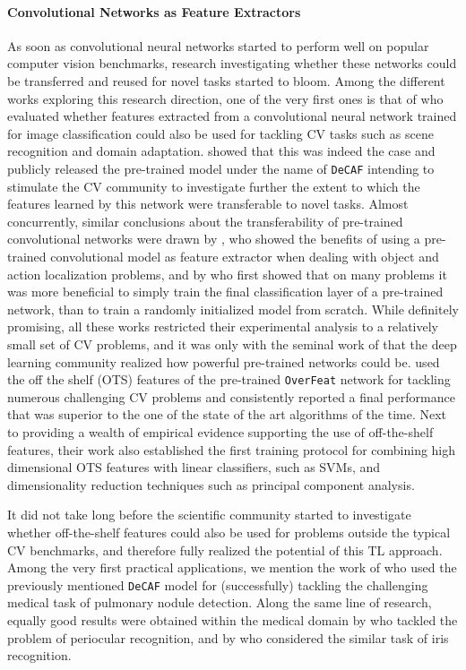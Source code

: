 \paragraph{Convolutional Networks as Feature Extractors}
As soon as convolutional neural networks started to perform well on popular computer vision benchmarks, research investigating whether these networks could be transferred and reused for novel tasks started to bloom. Among the different works exploring this research direction, one of the very first ones is that of \citet{donahue2014decaf} who evaluated whether features extracted from a convolutional neural network trained for image classification could also be used for tackling CV tasks such as scene recognition and domain adaptation. \citet{donahue2014decaf} showed that this was indeed the case and publicly released the pre-trained model under the name of \texttt{DeCAF} intending to stimulate the CV community to investigate further the extent to which the features learned by this network were transferable to novel tasks. Almost concurrently, similar conclusions about the transferability of pre-trained convolutional networks were drawn by \citet{oquab2014learning}, who showed the benefits of using a pre-trained convolutional model as feature extractor when dealing with object and action localization problems, and by \citet{zeiler2014visualizing} who first showed that on many problems it was more beneficial to simply train the final classification layer of a pre-trained network, than to train a randomly initialized model from scratch. While definitely promising, all these works restricted their experimental analysis to a relatively small set of CV problems, and it was only with the seminal work of \citet{sharif2014cnn} that the deep learning community realized how powerful pre-trained networks could be. \citet{sharif2014cnn} used the off the shelf (OTS) features of the pre-trained \texttt{OverFeat} network \cite{sermanet2013overfeat} for tackling numerous challenging CV problems and consistently reported a final performance that was superior to the one of the state of the art algorithms of the time. Next to providing a wealth of empirical evidence supporting the use of off-the-shelf features, their work also established the first training protocol for combining high dimensional OTS features with linear classifiers, such as SVMs, and dimensionality reduction techniques such as principal component analysis. 

It did not take long before the scientific community started to investigate whether off-the-shelf features could also be used for problems outside the typical CV benchmarks, and therefore fully realized the potential of this TL approach. Among the very first practical applications, we mention the work of \citet{van2015off} who used the previously mentioned \texttt{DeCAF} model for (successfully) tackling the challenging medical task of pulmonary nodule detection. Along the same line of research, equally good results were obtained within the medical domain by \citet{hernandez2018periocular} who tackled the problem of periocular recognition, and by \citet{nguyen2017iris} who considered the similar task of iris recognition.

